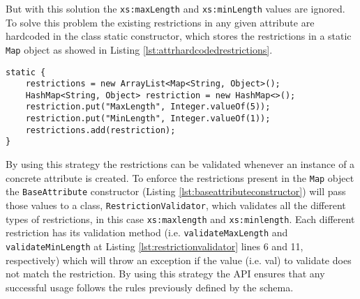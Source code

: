 \noindent
But with this solution the \texttt{xs:maxLength} and \texttt{xs:minLength} values are ignored. To solve this problem the existing restrictions in any given attribute are hardcoded in the class static constructor, which stores the restrictions in a static \texttt{Map} object as showed in Listing \ref{lst:attrhardcodedrestrictions}.

\bigskip


\begin{minipage}{\linewidth}
\begin{lstlisting}[caption={Attribute Static Constructor Restrictions},captionpos=b,label={lst:attrhardcodedrestrictions}]
static {
    restrictions = new ArrayList<Map<String, Object>();
    HashMap<String, Object> restriction = new HashMap<>();
    restriction.put("MaxLength", Integer.valueOf(5));
    restriction.put("MinLength", Integer.valueOf(1));
    restrictions.add(restriction);
}
\end{lstlisting}
\end{minipage}

\noindent
By using this strategy the restrictions can be validated whenever an instance of a concrete attribute is created. To enforce the restrictions present in the \texttt{Map} object the \texttt{BaseAttribute} constructor (Listing \ref{lst:baseattributeconstructor}) will pass those values to a class, \texttt{RestrictionValidator}, which validates all the different types of restrictions, in this case \texttt{xs:maxlength} and \texttt{xs:minlength}. Each different restriction has its validation method (i.e. \texttt{validateMaxLength} and \texttt{validateMinLength} at Listing \ref{lst:restrictionvalidator} lines 6 and 11, respectively) which will throw an exception if the value (i.e. val) to validate does not match the restriction. By using this strategy the \ac{API} ensures that any successful usage follows the rules previously defined by the schema.

\bigskip


